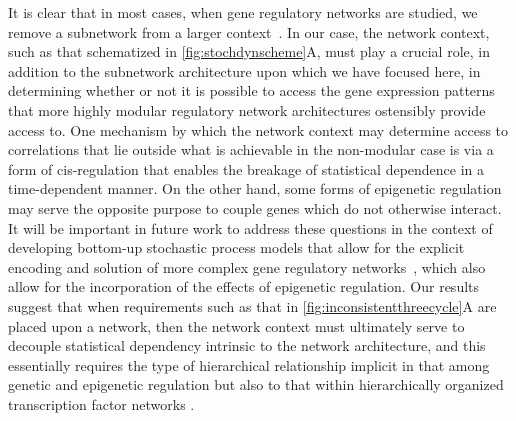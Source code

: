 It is clear that in most cases, when gene regulatory networks are studied, we remove a subnetwork from a larger context~\cite{Alon2007}. In our case, the network context, such as that schematized in \ref{fig:stochdynscheme}A, must play a crucial role, in addition to the subnetwork architecture upon which we have focused here, in determining whether or not it is possible to access the gene expression patterns that more highly modular regulatory network architectures ostensibly provide access to. One mechanism by which the network context may determine access to correlations that lie outside what is achievable in the non-modular case is via a form of cis-regulation that enables the breakage of statistical dependence in a time-dependent manner. On the other hand, some forms of epigenetic regulation may serve the opposite purpose to couple genes which do not otherwise interact. It will be important in future work to address these questions in the context of developing bottom-up stochastic process models that allow for the explicit encoding and solution of more complex gene regulatory networks~\cite{Walczak2009,Mugler2009}, which also allow for the incorporation of the effects of epigenetic regulation. Our results suggest that when requirements such as that in \ref{fig:inconsistentthreecycle}A are placed upon a network, then the network context must ultimately serve to decouple statistical dependency intrinsic to the network architecture, and this essentially requires the type of hierarchical relationship implicit in that among genetic and epigenetic regulation but also to that within hierarchically organized transcription factor networks \cite{Jothi2009,Bhardwaj2010,Chalancon2012,Colm}.


